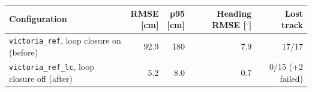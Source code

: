 \begin{tabular}{lrrrr}
\toprule
Configuration & \makecell[rb]{{RMSE} \\ {[cm]}} & \makecell[rb]{{p95} \\ {[cm]}} & \makecell[rb]{{Heading} \\ {RMSE [$^\circ$]}} & \makecell[rb]{{Lost} \\ {track}} \\
\midrule
\texttt{victoria\_ref}, loop closure on (before) & 92.9 & 180 & 7.9 & 17/17 \\
\texttt{victoria\_ref\_lc}, loop closure off (after) & 5.2 & 8.0 & 0.7 & 0/15 (+2 failed) \\
\bottomrule
\end{tabular}
